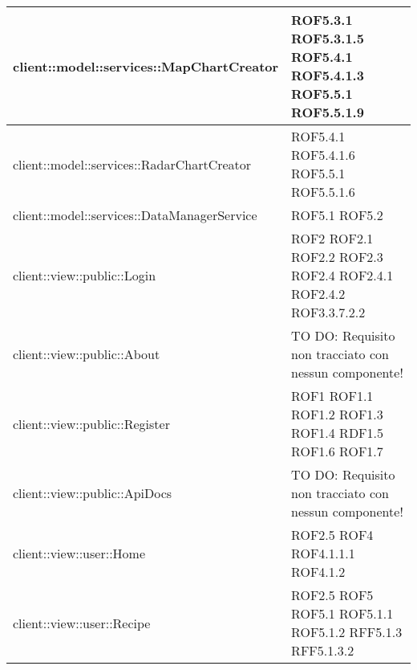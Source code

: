 \begin{center}
\begin{longtable}{| p{11cm} | p{2.5cm} |}
\hline
client::model::services::MapChartCreator & ROF5.3.1 \newline ROF5.3.1.5 \newline ROF5.4.1 \newline ROF5.4.1.3 \newline ROF5.5.1 \newline ROF5.5.1.9 \\
\hline
client::model::services::RadarChartCreator & ROF5.4.1 \newline ROF5.4.1.6 \newline ROF5.5.1 \newline ROF5.5.1.6 \\
\hline
client::model::services::DataManagerService & ROF5.1 \newline ROF5.2 \\
\hline
client::view::public::Login & ROF2 \newline ROF2.1 \newline ROF2.2 \newline ROF2.3 \newline ROF2.4 \newline ROF2.4.1 \newline ROF2.4.2 \newline ROF3.3.7.2.2 \\
\hline
client::view::public::About & TO DO: Requisito non tracciato con nessun componente! \\
\hline
client::view::public::Register & ROF1 \newline ROF1.1 \newline ROF1.2 \newline ROF1.3 \newline ROF1.4 \newline RDF1.5 \newline ROF1.6 \newline ROF1.7 \\
\hline
client::view::public::ApiDocs & TO DO: Requisito non tracciato con nessun componente! \\
\hline
client::view::user::Home & ROF2.5 \newline ROF4 \newline ROF4.1.1.1 \newline ROF4.1.2 \\
\hline
client::view::user::Recipe & ROF2.5 \newline ROF5 \newline ROF5.1 \newline ROF5.1.1 \newline ROF5.1.2 \newline RFF5.1.3 \newline RFF5.1.3.2 \\

\end{longtable}
\end{center}
